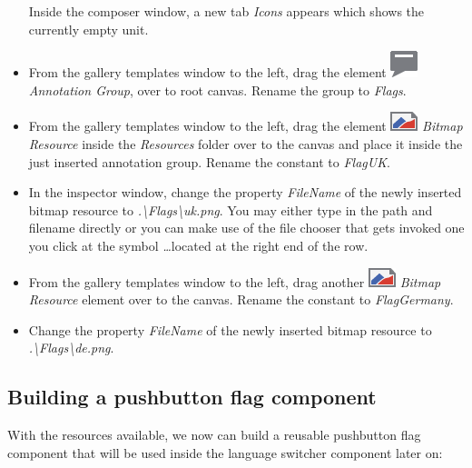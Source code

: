 \documentclass[
  a4paper,
,tablecaptionabove
]{scrbook}
\begin{document}
\begin{itemize}
  Inside the composer window, a new tab \emph{Icons} appears which shows
  the currently empty unit.
\item
  From the gallery templates window to the left, drag the element
  \includegraphics{./../asciidoc/modules/ROOT/assets/images/icons/AnnotationGroupIcon.png}
  \emph{Annotation Group}, over to root canvas. Rename the group to
  \emph{Flags}.
\item
  From the gallery templates window to the left, drag the element
  \includegraphics{./../asciidoc/modules/ROOT/assets/images/icons/BitmapResourceIcon.png}
  \emph{Bitmap Resource} inside the \emph{Resources} folder over to the
  canvas and place it inside the just inserted annotation group. Rename
  the constant to \emph{FlagUK}.
\item
  In the inspector window, change the property \emph{FileName} of the
  newly inserted bitmap resource to
  \emph{.\textbackslash Flags\textbackslash uk.png}. You may either type
  in the path and filename directly or you can make use of the file
  chooser that gets invoked one you click at the symbol \emph{\ldots​}
  located at the right end of the row.
\item
  From the gallery templates window to the left, drag another
  \includegraphics{./../asciidoc/modules/ROOT/assets/images/icons/BitmapResourceIcon.png}
  \emph{Bitmap Resource} element over to the canvas. Rename the constant
  to \emph{FlagGermany}.
\item
  Change the property \emph{FileName} of the newly inserted bitmap
  resource to \emph{.\textbackslash Flags\textbackslash de.png}.
\end{itemize}

\hypertarget{_building_a_pushbutton_flag_component}{%
\subsection{Building a pushbutton flag
component}\label{_building_a_pushbutton_flag_component}}

With the resources available, we now can build a reusable pushbutton
flag component that will be used inside the language switcher component
later on:
\end{document}
